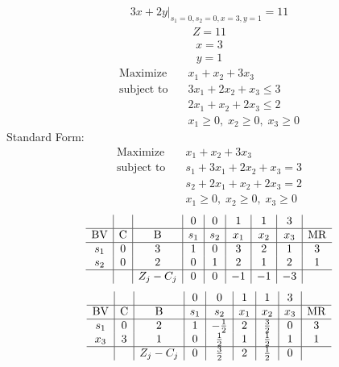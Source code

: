 \documentclass{article}
\begin{document}
\begin{align*}
\left.3x + 2y\right|_{s_{1}=0,s_{2}=0,x=3,y=1}=11\end{align*}
\begin{align*}
Z=11\end{align*}
\begin{align*}
x=3\end{align*}
\begin{align*}
y=1\end{align*}
\begin{align*}
\text{Maximize} \quad & x_{1} + x_{2} + 3x_{3}\\
\text{subject to} \quad
& 3x_{1} + 2x_{2} + x_{3}\le3\\
& 2x_{1} + x_{2} + 2x_{3}\le2\\
& x_{1}\ge0,\; x_{2}\ge0,\; x_{3}\ge0\end{align*}
Standard Form:\\
\begin{align*}
\text{Maximize} \quad & x_{1} + x_{2} + 3x_{3}\\
\text{subject to} \quad
& s_{1} + 3x_{1} + 2x_{2} + x_{3}=3\\
& s_{2} + 2x_{1} + x_{2} + 2x_{3}=2\\
& x_{1}\ge0,\; x_{2}\ge0,\; x_{3}\ge0\end{align*}
\begin{align*}
\begin{array}{c|c|c|c|c|c|c|c|c}
 &  &  & 0 & 0 & 1 & 1 & 3 & \\
\hline
\text{BV} & \text{C} & \text{B} & s_{1} & s_{2} & x_{1} & x_{2} & x_{3} & \text{MR} \\
\hline
s_{1} & 0 & 3 & 1 & 0 & 3 & 2 & 1 & 3 \\
s_{2} & 0 & 2 & 0 & 1 & 2 & 1 & 2 & 1 \\
\hline
 &  & Z_j-C_j & 0 & 0 & -1 & -1 & -3 & \\
\end{array}
\end{align*}
\begin{align*}
\begin{array}{c|c|c|c|c|c|c|c|c}
 &  &  & 0 & 0 & 1 & 1 & 3 & \\
\hline
\text{BV} & \text{C} & \text{B} & s_{1} & s_{2} & x_{1} & x_{2} & x_{3} & \text{MR} \\
\hline
s_{1} & 0 & 2 & 1 & -\frac{1}{2} & 2 & \frac{3}{2} & 0 & 3 \\
x_{3} & 3 & 1 & 0 & \frac{1}{2} & 1 & \frac{1}{2} & 1 & 1 \\
\hline
 &  & Z_j-C_j & 0 & \frac{3}{2} & 2 & \frac{1}{2} & 0 & \\
\end{array}
\end{align*}
\end{document}
